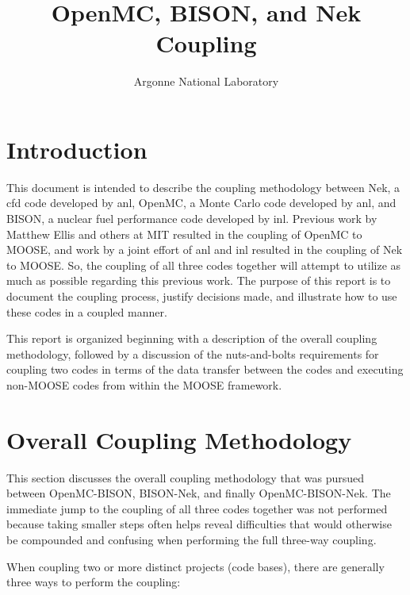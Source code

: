 \documentclass[10pt]{article}
\numberwithin{equation}{section} %
\begin{document}
\title{OpenMC, BISON, and Nek Coupling}
\author{Argonne National Laboratory}
\maketitle

\tableofcontents

\clearpage

\section{Introduction}

This document is intended to describe the coupling methodology between Nek, a \gls{cfd} code developed by \gls{anl}, OpenMC, a Monte Carlo code developed by \gls{anl}, and BISON, a nuclear fuel performance code developed by \gls{inl}. Previous work by Matthew Ellis and others at MIT resulted in the coupling of OpenMC to MOOSE, and work by a joint effort of \gls{anl} and \gls{inl} resulted in the coupling of Nek to MOOSE. So, the coupling of all three codes together will attempt to utilize as much as possible regarding this previous work. The purpose of this report is to document the coupling process, justify decisions made, and illustrate how to use these codes in a coupled manner.

This report is organized beginning with a description of the overall coupling methodology, followed by a discussion of the nuts-and-bolts requirements for coupling two codes in terms of the data transfer between the codes and executing non-MOOSE codes from within the MOOSE framework.

\section{Overall Coupling Methodology}
This section discusses the overall coupling methodology that was pursued between OpenMC-BISON, BISON-Nek, and finally OpenMC-BISON-Nek. The immediate jump to the coupling of all three codes together was not performed because taking smaller steps often helps reveal difficulties that would otherwise be compounded and confusing when performing the full three-way coupling. 

When coupling two or more distinct projects (code bases), there are generally three ways to perform the coupling:
\end{document}
